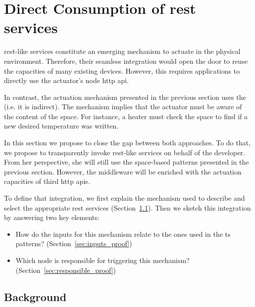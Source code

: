 
\section{Direct Consumption of \acs{rest} services}

\ac{rest}-like services constitute an emerging mechanism to actuate in the physical environment. %
Therefore, their seamless integration would open the door to reuse the capacities of many existing devices. %
However, this requires applications to directly use the actuator's node \ac{http} \ac{api}.


In contrast, the actuation mechanism presented in the previous section uses the \Space{} (i.e. it is indirect).
The mechanism implies that the actuator must be aware of the content of the space.
For instance, a heater must check the space to find if a new desired temperature was written.


In this section we propose to close the gap between both approaches.
To do that, we propose to transparently invoke \ac{rest}-like services on behalf of the developer.
From her perspective, she will still use the space-based patterns presented in the previous section.
However, the middleware will be enriched with the actuation capacities of third \ac{http} \acp{api}.


To define that integration, we first explain the mechanism used to describe and select the appropriate \ac{rest} services (Section~\ref{sec:background_restdesc}).
Then we sketch this integration by answering two key elements:
\begin{itemize}
  \item How do the inputs for this mechanism relate to the ones used in the \ac{ts} patterns? (Section~\ref{sec:inputs_proof})
  \item Which node is responsible for triggering this mechanism? (Section~\ref{sec:responsible_proof})
\end{itemize}



\subsection{Background}
\label{sec:background_restdesc}

